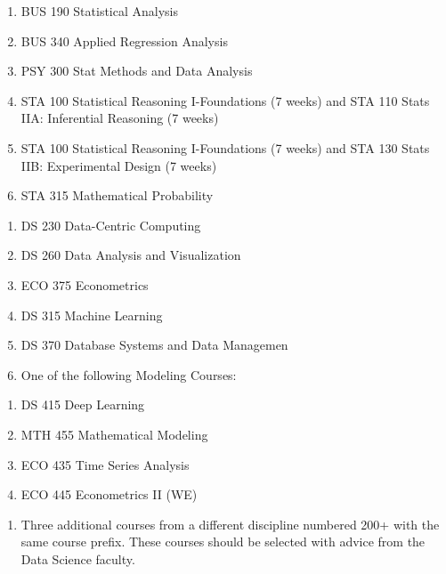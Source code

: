 \documentclass[
  letterpaper,
]{scrbook}
\providecommand{\tightlist}{%
  \setlength{\itemsep}{0pt}\setlength{\parskip}{0pt}}
\begin{document}
\begin{enumerate}
\def\labelenumi{\alph{enumi}.}
\tightlist
\item
  BUS 190 Statistical Analysis\\
\item
  BUS 340 Applied Regression Analysis\\
\item
  PSY 300 Stat Methods and Data Analysis\\
\item
  STA 100 Statistical Reasoning I-Foundations (7 weeks) and STA 110
  Stats IIA: Inferential Reasoning (7 weeks)\\
\item
  STA 100 Statistical Reasoning I-Foundations (7 weeks) and STA 130
  Stats IIB: Experimental Design (7 weeks)\\
\item
  STA 315 Mathematical Probability\\
\end{enumerate}

\begin{enumerate}
\def\labelenumi{\arabic{enumi}.}
\setcounter{enumi}{3}
\tightlist
\item
  DS 230 Data-Centric Computing
\item
  DS 260 Data Analysis and Visualization
\item
  ECO 375 Econometrics
\item
  DS 315 Machine Learning
\item
  DS 370 Database Systems and Data Managemen
\item
  One of the following Modeling Courses:
\end{enumerate}

\begin{enumerate}
\def\labelenumi{\alph{enumi}.}
\tightlist
\item
  DS 415 Deep Learning\\
\item
  MTH 455 Mathematical Modeling\\
\item
  ECO 435 Time Series Analysis
\item
  ECO 445 Econometrics II (WE)
\end{enumerate}

\begin{enumerate}
\def\labelenumi{\arabic{enumi}.}
\setcounter{enumi}{9}
\tightlist
\item
  Three additional courses from a different discipline numbered 200+
  with the same course prefix. These courses should be selected with
  advice from the Data Science faculty.
\end{enumerate}
\end{document}
